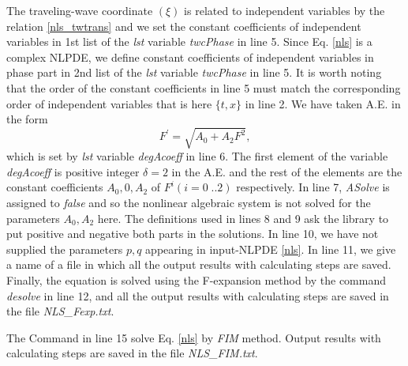 \documentclass[prd,aps,floats,showkeys,nofootinbib,notitlepage]{revtex4-2}
\begin{document}
	The traveling-wave coordinate $(\xi)$ is related to independent variables by the relation \eqref{nls_twtrans} and we set the constant coefficients of independent variables in 1st list of the {\em lst} variable {\em twcPhase} in line 5. Since Eq. \eqref{nls} is a complex NLPDE, we define constant coefficients of independent variables in phase part in 2nd list of the {\em lst} variable {\em twcPhase} in line 5. It is worth noting that the order of the constant coefficients in line 5 must match the corresponding order of independent variables that is here $\{t,x\}$ in line 2.
	We have taken A.E. in the form
	\begin{equation}\label{nlsAE}
		F^{\prime}=\sqrt{A_0+A_2F^2},
	\end{equation}
	which is set by {\em lst} variable {\em degAcoeff} in line 6. The first element of the variable {\em degAcoeff} is positive integer $\delta=2$ in the A.E. and the rest of the elements are the constant coefficients $A_0,0,A_2$ of $F^i(i=0\;..2)$ respectively. In line 7, {\em ASolve} is assigned to {\em false} and so the nonlinear algebraic system is not solved for the parameters $A_0,A_2$ here. The definitions used in lines 8 and 9 ask the library to put positive and negative both parts in the solutions. In line 10, we have not supplied the parameters $p,q$ appearing in input-NLPDE \eqref{nls}.
	In line 11, we give a name of a file in which all the output results with calculating steps are saved.
	Finally, the equation is solved using the F-expansion method by the command {\em desolve} in line 12, and all the output results with calculating steps are saved in the file \emph{NLS{\_}Fexp.txt}. 
	\par The Command in line 15 solve Eq. \eqref{nls} by {\em FIM} method. 
	Output results with calculating steps are saved in the file \emph{NLS\_FIM.txt}. 
\end{document}
